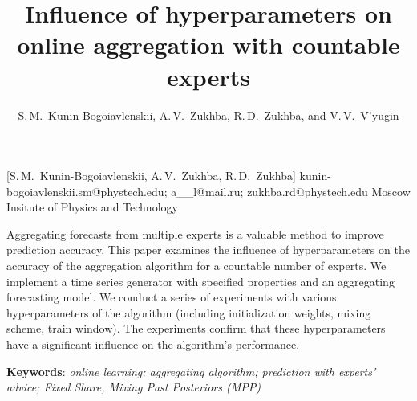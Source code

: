 \documentclass[12pt, twoside]{article}
\begin{document}
\English

\title
    [] %
    {Influence of hyperparameters on online aggregation with countable experts} %
\author
    [S.\,M.~Kunin-Bogoiavlenskii] %
    {S.\,M.~Kunin-Bogoiavlenskii, A.\,V.~Zukhba, R.\,D.~Zukhba, and V.\,V.~V’yugin} %
    [S.\,M.~Kunin-Bogoiavlenskii, A.\,V.~Zukhba, R.\,D.~Zukhba] %
\email
    {kunin-bogoiavlenskii.sm@phystech.edu; a\_\_l@mail.ru; zukhba.rd@phystech.edu}
\organization
    {Moscow Insitute of Physics and Technology}
\abstract
    {

    Aggregating forecasts from multiple experts is a valuable method to improve prediction accuracy.
    This paper examines the influence of hyperparameters on the accuracy of the aggregation algorithm for a countable number of experts.
    We implement a time series generator with specified properties and an aggregating forecasting model. 
    We conduct a series of experiments with various hyperparameters of the algorithm (including initialization weights, mixing scheme, train window). 
    The experiments confirm that these hyperparameters have a significant influence on the algorithm's performance.           
        
%   
%   
%   
%               
    \noindent
        \textbf{Keywords}: \emph{online learning; aggregating algorithm; prediction with experts’ advice; Fixed Share, Mixing Past Posteriors (MPP)}}

\end{document}
